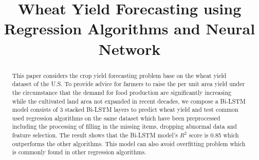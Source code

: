\documentclass[conference, a4paper]{IEEEtran}
\begin{document}
\title{Wheat Yield Forecasting using Regression Algorithms and Neural Network}

\author{
\and
{}
\and
{}
\and
{}
}

\maketitle

\begin{abstract}
  This paper considers the crop yield forecasting problem base on the wheat yield dataset of the U.S. To provide advice for farmers to raise the per unit area yield under the circumstance that the demand for food production are significantly increasing while the cultivated land area not expanded in recent decades, we compose a Bi-LSTM model consists of 3 stacked Bi-LSTM layers to predict wheat yield and test common used regression algorithms on the same dataset which have been preprocessed including the processing of filling in the missing items, dropping abnormal data and feature selection. The result shows that the Bi-LSTM model's $R^2$ score is 0.85 which outperforms the other algorithms. This model can also avoid overfitting problem which is commonly found in other regression algorithms. 
\end{abstract}
\end{document}
